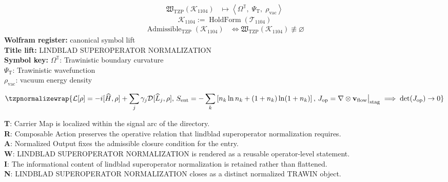 \noindent
\begin{minipage}[t]{0.48\linewidth}
\begingroup
\small
\[
\begin{aligned}
\mathfrak{W}_{\mathrm{TZP}}\!\left(\mathcal{K}_{1104}\right)
&\longmapsto
\left\langle \Omega^{\mathbb{T}},\; \Psi_{\mathrm{T}},\; \rho_{\mathrm{vac}} \right\rangle
\end{aligned}
\]
\[
\mathcal{K}_{1104}
:=
\operatorname{HoldForm}\!\left(\mathcal{T}_{1104}\right)
\]
\[
\begin{aligned}
\operatorname{Admissible}_{\mathrm{TZP}}\!\left(\mathcal{K}_{1104}\right)
&\Longleftrightarrow
\mathfrak{W}_{\mathrm{TZP}}\!\left(\mathcal{K}_{1104}\right)\not\equiv\varnothing
\end{aligned}
\]
\textbf{Wolfram register:} canonical symbol lift\\
\textbf{Title lift:} LINDBLAD SUPEROPERATOR NORMALIZATION\\
\textbf{Symbol key:} \(\Omega^{\mathbb{T}}\): Trawinistic boundary curvature\\ \(\Psi_{\mathrm{T}}\): Trawinistic wavefunction\\ \(\rho_{\mathrm{vac}}\): vacuum energy density
\par
\endgroup
\end{minipage}\hfill
\begin{minipage}[t]{0.48\linewidth}
\[
\tzpnormalizewrap{\mathcal{L}[\rho]=-i[\widehat{H},\rho]+\sum_j\gamma_j\mathcal{D}[\widehat{L}_j,\rho],\,S_{\mathrm{ent}}=-\sum_k\left[n_k\ln n_k+(1+n_k)\ln(1+n_k)\right],\,J_{\mathrm{op}}=\nabla\otimes\mathbf{v}_{\mathrm{flow}}\big|_{\mathrm{stag}}\implies\det(J_{\mathrm{op}})\to0}
\]

\small
\textbf{T}: Carrier Map is localized within the signal arc of the directory.\\
\textbf{R}: Composable Action preserves the operative relation that lindblad superoperator normalization requires.\\
\textbf{A}: Normalized Output fixes the admissible closure condition for the entry.\\
\textbf{W}: LINDBLAD SUPEROPERATOR NORMALIZATION is rendered as a reusable operator-level statement.\\
\textbf{I}: The informational content of lindblad superoperator normalization is retained rather than flattened.\\
\textbf{N}: LINDBLAD SUPEROPERATOR NORMALIZATION closes as a distinct normalized TRAWIN object.
\normalsize
\end{minipage}

